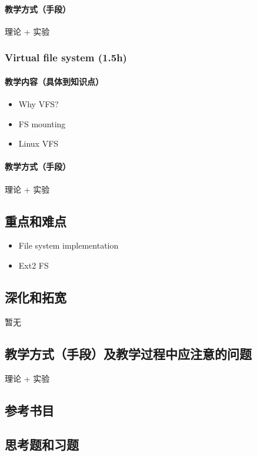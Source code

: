 \documentclass[11pt]{article}
\begin{document}
\paragraph{教学方式（手段）}
\label{sec-7-2-4-2}
理论 + 实验
\subsubsection{Virtual file system (1.5h)}
\label{sec-7-2-5}
\paragraph{教学内容（具体到知识点）}
\label{sec-7-2-5-1}
\begin{itemize}
\item Why VFS?
\item FS mounting
\item Linux VFS
\end{itemize}
\paragraph{教学方式（手段）}
\label{sec-7-2-5-2}
理论 + 实验
\subsection{重点和难点}
\label{sec-7-3}
\begin{itemize}
\item File system implementation
\item Ext2 FS
\end{itemize}
\subsection{深化和拓宽}
\label{sec-7-4}
暂无
\subsection{教学方式（手段）及教学过程中应注意的问题}
\label{sec-7-5}
理论 + 实验
\subsection{参考书目}
\label{sec-7-6}
\subsection{思考题和习题}
\label{sec-7-7}




\end{document}
